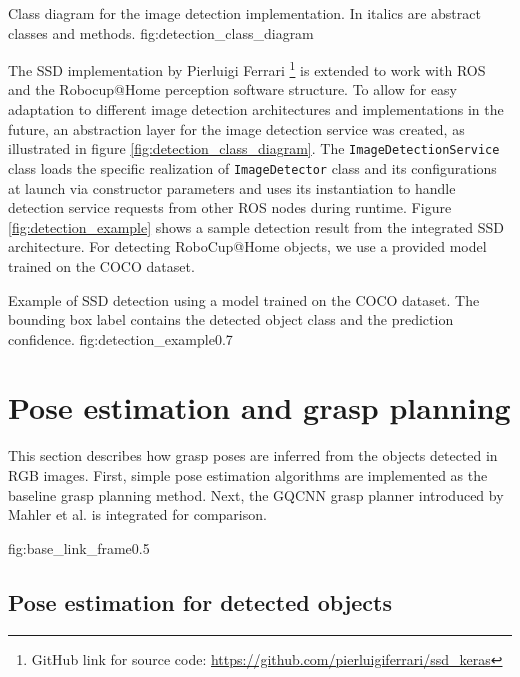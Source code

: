              {Class diagram for the image detection implementation. In italics are abstract classes and methods.}
             {fig:detection_class_diagram}{\textwidth}

The SSD implementation by Pierluigi Ferrari \footnote{GitHub link for source code:
    \url{https://github.com/pierluigiferrari/ssd_keras}} is extended to work with ROS and the Robocup@Home perception
software structure. To allow for easy adaptation to different image detection architectures and implementations in the
future, an abstraction layer for the image detection service was created, as illustrated in figure
\ref{fig:detection_class_diagram}. The \texttt{ImageDetectionService} class loads the specific realization of
\texttt{ImageDetector} class and its configurations at launch via constructor parameters and uses its instantiation to
handle detection service requests from other ROS nodes during runtime. Figure \ref{fig:detection_example} shows a
sample detection result from the integrated SSD architecture. For detecting RoboCup@Home objects, we use a provided
model trained on the COCO dataset.

             {Example of SSD detection using a model trained on the COCO dataset. The bounding box label contains the
              detected object class and the prediction confidence.}
             {fig:detection_example}{0.7\textwidth}


\section{Pose estimation and grasp planning}

This section describes how grasp poses are inferred from the objects detected in RGB images. First, simple pose
estimation algorithms are implemented as the baseline grasp planning method. Next, the GQCNN grasp planner introduced
by Mahler et al. \cite{mahler2017} is integrated for comparison.

             {fig:base_link_frame}{0.5\textwidth}

\subsection{Pose estimation for detected objects} \label{sub:pose_estimation}

